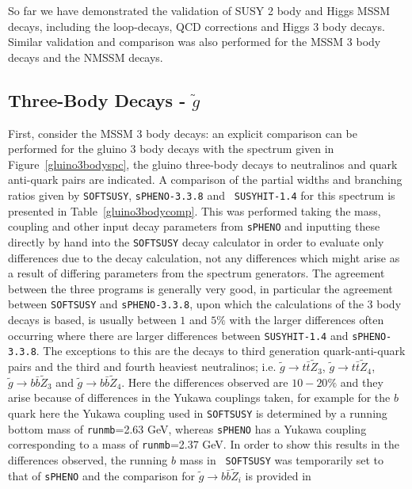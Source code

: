 \documentclass[final,3p,times,pdflatex]{elsarticle}
\def\code#1{{\tt #1}}
\begin{document}
So far we have demonstrated the validation of SUSY 2 body and Higgs MSSM
decays, including the loop-decays, QCD corrections and Higgs 3 body
decays. Similar validation and comparison was also performed for the MSSM
3 body decays and the NMSSM decays. 


\subsection{Three-Body Decays - $\tilde{g}$} \label{glu3bodysec}

First, consider the MSSM 3 body decays: an explicit comparison can be
performed for the gluino 3 body decays with the spectrum given in
Figure~\ref{gluino3bodyspc}, the gluino three-body decays to neutralinos and
quark anti-quark pairs are indicated. A comparison of the partial widths and
branching ratios given by {\tt SOFTSUSY}, {\tt sPHENO-3.3.8} and {\tt
  SUSYHIT-1.4} for 
this spectrum is presented in Table~\ref{gluino3bodycomp}. This was performed
taking the mass, coupling and other input decay parameters from {\tt sPHENO}
and inputting these directly by hand 
into the {\tt SOFTSUSY} decay calculator in order to evaluate only differences
due to 
the decay calculation, not any differences which might arise as a result of
differing parameters from the spectrum generators. The agreement
between the three programs is generally very good, in particular the agreement
between {\tt SOFTSUSY} and {\tt sPHENO-3.3.8}, upon which the calculations of
the 3 body decays is based, is usually between $1$ and $5\%$ with the
larger differences often occurring where there are larger differences between
{\tt SUSYHIT-1.4} and {\tt sPHENO-3.3.8}. The exceptions to this are the
decays to third generation quark-anti-quark pairs and the third and fourth
heaviest neutralinos; i.e. $\tilde{g} \rightarrow t \bar{t} \tilde{Z}_{3}$,
$\tilde{g} \rightarrow t \bar{t} \tilde{Z}_{4}$, $\tilde{g} \rightarrow b
\bar{b} \tilde{Z}_{3}$ and $\tilde{g} \rightarrow b \bar{b}
\tilde{Z}_{4}$. Here the differences observed are $10-20\%$ and they arise
because of differences in the Yukawa couplings taken, for example for the $b$
quark here the Yukawa coupling used in {\tt SOFTSUSY} is determined by a
running bottom mass of \code{runmb}=2.63 GeV, whereas {\tt sPHENO} has a
Yukawa coupling corresponding to a mass of \code{runmb}=2.37 GeV. In order to
show this results in the differences observed, the running $b$ mass in {\tt
  SOFTSUSY} was temporarily set to that of {\tt sPHENO} and the comparison for
$\tilde{g} \rightarrow b \bar{b} \tilde{Z}_i$ is provided in
\end{document}
